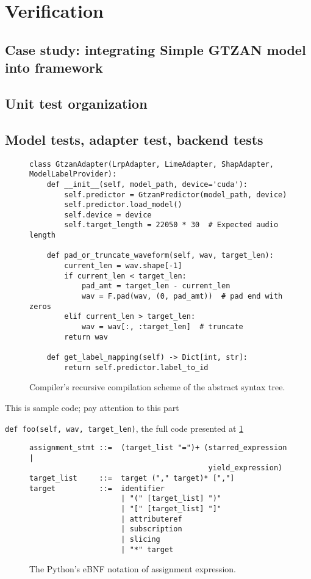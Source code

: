 \documentclass[
    bindingoffset=5mm,  %
    footnoteindent=3mm, %
    hyphenation=true    %
]{src/wut-thesis}
\begin{document}
\section{Verification} \label{ch:verification}

\subsection{Case study: integrating Simple GTZAN model into framework}
\subsection{Unit test organization}
\subsection{Model tests, adapter test, backend tests}

\begin{figure}%
\begin{verbatim}
class GtzanAdapter(LrpAdapter, LimeAdapter, ShapAdapter, ModelLabelProvider):
    def __init__(self, model_path, device='cuda'):
        self.predictor = GtzanPredictor(model_path, device)
        self.predictor.load_model()
        self.device = device
        self.target_length = 22050 * 30  # Expected audio length

    def pad_or_truncate_waveform(self, wav, target_len):
        current_len = wav.shape[-1]
        if current_len < target_len:
            pad_amt = target_len - current_len
            wav = F.pad(wav, (0, pad_amt))  # pad end with zeros
        elif current_len > target_len:
            wav = wav[:, :target_len]  # truncate
        return wav
    
    def get_label_mapping(self) -> Dict[int, str]:
        return self.predictor.label_to_id
\end{verbatim}
\caption{Compiler's recursive compilation scheme of the abstract syntax tree.}
\label{fig:RecursiveCompilation}
\end{figure}

This is sample code; pay attention to this part

\texttt{def foo(self, wav, target_len)},
the full code presented at \ref{fig:RecursiveCompilation}

\begin{figure}%
\begin{verbatim}
assignment_stmt ::=  (target_list "=")+ (starred_expression |
                                         yield_expression)
target_list     ::=  target ("," target)* [","]
target          ::=  identifier
                     | "(" [target_list] ")"
                     | "[" [target_list] "]"
                     | attributeref
                     | subscription
                     | slicing
                     | "*" target
\end{verbatim}
\caption{The Python's eBNF notation of assignment expression.}
\label{fig:PythonExampleRule}
\end{figure}
\end{document}

